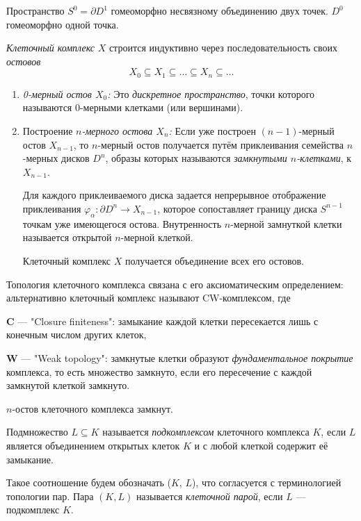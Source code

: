 \documentclass[10pt, twoside]{article}
\begin{document}
\begin{remark}
    Пространство $S^0 = \partial D^1$ гомеоморфно несвязному объединению двух точек. $D^0$ гомеоморфно одной точка.
\end{remark}

\begin{definition}
    \emph{Клеточный комплекс} $X$ строится индуктивно через последовательность своих \emph{остовов} $$X_0 \subseteq X_1 \subseteq \ldots \subseteq X_n \subseteq \ldots$$
    
    \begin{enumerate}
        \item \emph{0-мерный остов $X_0$:} Это \emph{дискретное пространство}, точки которого называются 0-мерными клетками (или вершинами).  
        \item Построение \emph{$n$-мерного остова $X_n$:} Если уже построен $(n-1)$-мерный остов $X_{n-1}$, то $n$-мерный остов получается путём приклеивания семейства $n$-мерных дисков $D^n$, образы которых называются \emph{замкнутыми $n$-клетками}, к $X_{n-1}$.
        
        Для каждого приклеиваемого диска задается непрерывное отображение приклеивания $\varphi_\alpha \colon \partial D^{n} \to X_{n-1}$, которое сопоставляет границу диска $S^{n-1}$ точкам уже имеющегося остова.
        Внутренность $n$-мерной замнуткой клетки называется открытой $n$-мерной клеткой.

        Клеточный комплекс $X$ получается объединение всех его остовов.
    \end{enumerate}
\end{definition}

Топология клеточного комплекса связана с его аксиоматическим определением: альтернативно клеточный комплекс называют CW-комплексом, где
\begin{bullets} 
    \item \textbf C --- "Closure finiteness": замыкание каждой клетки пересекается лишь с конечным числом других клеток, 
    \item \textbf W --- "Weak topology": замкнутые клетки образуют \emph{фундаментальное покрытие} комплекса, то есть множество замкнуто, если его пересечение с каждой замкнутой клеткой замкнуто. 
\end{bullets}

\begin{practice}
    $n$-остов клеточного комплекса замкнут.
\end{practice}

\begin{definition}
    Подмножество $L \subseteq K$ называется \emph{подкомплексом} клеточного комплекса $K$, если $L$ является объединением открытых клеток $K$ и с любой клеткой содержит её замыкание.

    Такое соотношение будем обозначать ($K$, $L$), что согласуется с терминологией топологии пар. Пара $(K, L)$ называется \emph{клеточной парой}, если $L$ --- подкомплекс $K$.
\end{definition}
\end{document}

